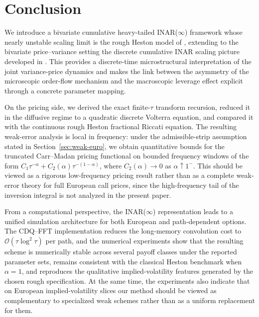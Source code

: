 \documentclass[letterpaper]{article}
\numberwithin{equation}{section}
\theoremstyle{definition}
\theoremstyle{remark}
\begin{document}

\section{Conclusion}\label{sec:conclusion}

We introduce a bivariate cumulative heavy-tailed INAR($\infty$) framework whose nearly unstable scaling limit is the rough Heston model of \cite{el2019characteristic}, extending to the bivariate price--variance setting the discrete cumulative INAR scaling picture developed in \cite{wang2026scaling}. This provides a discrete-time microstructural interpretation of the joint variance-price dynamics and makes the link between the asymmetry of the microscopic order-flow mechanism and the macroscopic leverage effect explicit through a concrete parameter mapping.

On the pricing side, we derived the exact finite-$\tau$ transform recursion, reduced it in the diffusive regime to a quadratic discrete Volterra equation, and compared it with the continuous rough Heston fractional Riccati equation. The resulting weak-error analysis is local in frequency: under the admissible-strip assumption stated in Section~\ref{sec:weak-euro}, we obtain quantitative bounds for the truncated Carr--Madan pricing functional on bounded frequency windows of the form $C_1\tau^{-\alpha}+C_2(\alpha)\tau^{-(1-\alpha)}$, where $C_2(\alpha)\to0$ as $\alpha\uparrow1^-$. This should be viewed as a rigorous low-frequency pricing result rather than as a complete weak-error theory for full European call prices, since the high-frequency tail of the inversion integral is not analyzed in the present paper.

From a computational perspective, the INAR($\infty$) representation leads to a unified simulation architecture for both European and path-dependent options. The CDQ--FFT implementation reduces the long-memory convolution cost to $\mathcal O(\tau\log^2\tau)$ per path, and the numerical experiments show that the resulting scheme is numerically stable across several payoff classes under the reported parameter sets, remains consistent with the classical Heston benchmark when $\alpha=1$, and reproduces the qualitative implied-volatility features generated by the chosen rough specification. At the same time, the experiments also indicate that on European implied-volatility slices our method should be viewed as complementary to specialized weak schemes rather than as a uniform replacement for them.
\end{document}
